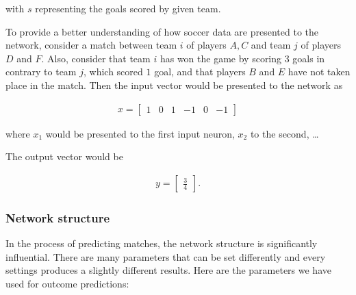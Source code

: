 \noindent with $s$ representing the goals scored by given team.

\examplespace
\begin{example}
To provide a better understanding of how soccer data are presented to the network, consider a match between team $i$ of players $A, C$ and team $j$ of players $D$ and $F$. Also, consider that team $i$ has won the game by scoring 3 goals in contrary to team $j$, which scored $1$ goal, and that players $B$ and $E$ have not taken place in the match. Then the input vector would be presented to the network as

\begin{align*}
x = \begin{bmatrix}
1 & 0 & 1 & -1 & 0 & -1
\end{bmatrix}
\end{align*}

\noindent where $x_1$ would be presented to the first input neuron, $x_2$ to the second, \dots

The output vector would be

\begin{align*}
y = \begin{bmatrix}
\frac{3}{4}
\end{bmatrix}.
\end{align*}
\end{example}

\subsubsection{Network structure}
In the process of predicting matches, the network structure is significantly influential. There are many parameters that can be set differently and every settings produces a slightly different results. Here are the parameters we have used for outcome predictions:

